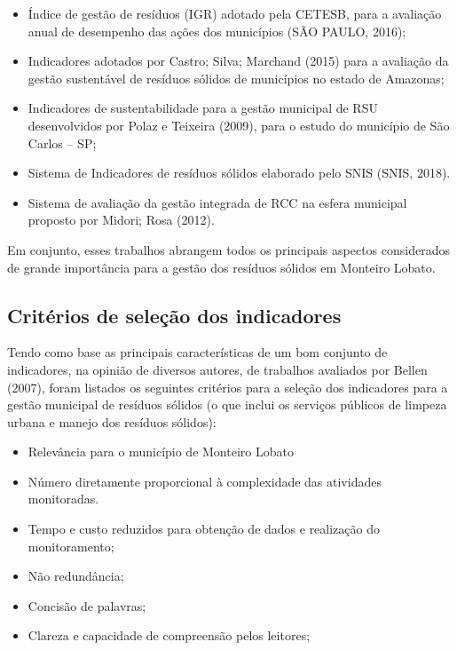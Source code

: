 	\begin{itemize}
		\item Índice de gestão de resíduos (IGR) adotado pela CETESB, para a avaliação anual de desempenho das ações dos municípios (SÃO PAULO, 2016);
		\item Indicadores adotados por Castro; Silva; Marchand (2015) para a avaliação da gestão sustentável de resíduos sólidos de municípios no estado de Amazonas;
		\item Indicadores de sustentabilidade para a gestão municipal de RSU desenvolvidos por Polaz e Teixeira (2009), para o estudo do município de São Carlos – SP;
		\item Sistema de Indicadores de resíduos sólidos elaborado pelo SNIS (SNIS, 2018).
		\item Sistema de avaliação da gestão integrada de RCC na esfera municipal proposto por Midori; Rosa (2012).
	\end{itemize}
	
	Em conjunto, esses trabalhos abrangem todos os principais aspectos considerados de grande importância para a gestão dos resíduos sólidos em Monteiro Lobato. 
	
	\subsection{Critérios de seleção dos indicadores}

	Tendo como base as principais características de um bom conjunto de indicadores, na opinião de diversos autores, de trabalhos avaliados por Bellen (2007), foram listados os seguintes critérios para a seleção dos indicadores para a gestão municipal de resíduos sólidos (o que inclui os serviços públicos de limpeza urbana e manejo dos resíduos sólidos):
	
	\begin{itemize}
		\item Relevância para o município de Monteiro Lobato
		\item Número diretamente proporcional à complexidade das atividades monitoradas.
		\item Tempo e custo reduzidos para obtenção de dados e realização do monitoramento;
		\item Não redundância;
		\item Concisão de palavras;
		\item Clareza e capacidade de compreensão pelos leitores;
	
	\end{itemize}

